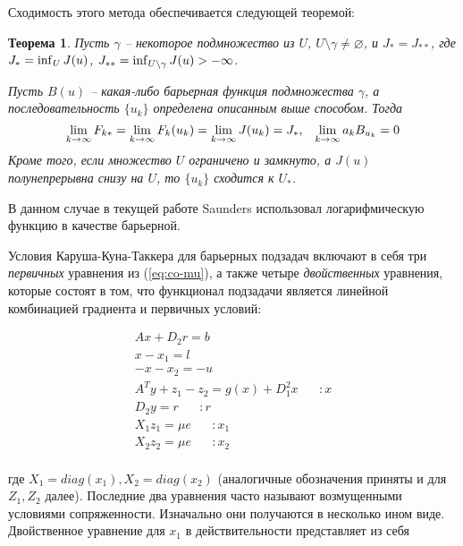 \documentclass[a4paper, 12pt, titlepage]{article}
\theoremstyle{definition}
\theoremstyle{plain}
\newtheorem{SmartTheorem}{Теорема}
\theoremstyle{plain}
\begin{document}
Сходимость этого метода обеспечивается следующей теоремой:

\begin{SmartTheorem}
 Пусть $\gamma$ -- некоторое подмножество из $U$,
 $U \setminus \gamma \neq \varnothing$, и $J_{*} = J_{**}$, где
 $J_{*} = \operatornamewithlimits{inf}_{U} J(u)$,
 $J_{**} = \operatornamewithlimits{inf}_{U \setminus \gamma} J(u) > -\infty$.
 
 Пусть $B(u)$ -- какая-либо барьерная функция подмножества $\gamma$, а
 последовательность $\{u_{k}\}$ определена описанным выше способом. Тогда
 \begin{equation}
  \operatornamewithlimits{lim}_{k \to \infty} F_{k*} =
  \operatornamewithlimits{lim}_{k \to \infty} F_{k}(u_{k}) =
  \operatornamewithlimits{lim}_{k \to \infty} J(u_{k}) = J_{*}, \;\;\;
  \operatornamewithlimits{lim}_{k \to \infty} a_{k} B_{u_{k}} = 0
 \end{equation}
 Кроме того, если множество $U$ ограничено и замкнуто, а $J(u)$
 полунепрерывна снизу на $U$, то $\{u_{k}\}$ сходится к $U_{*}$.
\end{SmartTheorem}

В данном случае в текущей работе Saunders использовал логарифмическую функцию в
качестве барьерной.

Условия Каруша-Куна-Таккера для барьерных подзадач включают в себя три 
\textit{первичных} уравнения из (\ref{eq:co-mu}), а также четыре 
\textit{двойственных} уравнения, которые состоят в том, что функционал
подзадачи является линейной комбинацией градиента и первичных условий:

\begin{equation}
 \begin{aligned}
  A x + D_{2} r = b \\
  x - x_{1} = l \\
  -x - x_{2} = -u \\
  A^{T} y + z_{1} - z_{2} = g(x) + D_{1}^{2} x \;\;\;\;\;\; :x \\
  D_{2} y = r \;\;\;\;\;\; :r \\
  X_{1} z_{1} = \mu e \;\;\;\;\;\; :x_{1} \\
  X_{2} z_{2} = \mu e \;\;\;\;\;\; :x_{2} \\
 \end{aligned}
\end{equation}

где $X_{1} = diag(x_{1}), X_{2} = diag(x_{2})$ (аналогичные обозначения приняты
и для $Z_{1}, Z_{2}$ далее). Последние два уравнения часто называют
возмущенными условиями сопряженности. Изначально они получаются в несколько
ином виде. Двойственное уравнение для $x_{1}$ в действительности представляет
из себя
\end{document}
